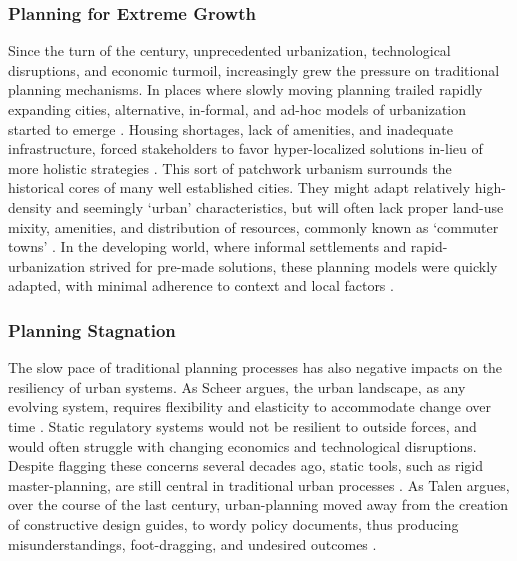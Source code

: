 {{        \subsubsection{Planning for Extreme Growth}
        {
            Since the turn of the century, unprecedented urbanization, technological disruptions, and economic turmoil, increasingly grew the pressure on traditional planning mechanisms. In places where slowly moving planning trailed rapidly expanding cities, alternative, in-formal, and ad-hoc models of urbanization started to emerge \cite{UnitedNationsHabitatIII2017}. Housing shortages, lack of amenities, and inadequate infrastructure, forced stakeholders to favor hyper-localized solutions in-lieu of more holistic strategies \cite{banerjee2011companion}. This sort of patchwork urbanism surrounds the historical cores of many well established cities. They might adapt relatively high-density and seemingly `urban' characteristics, but will often lack proper land-use mixity, amenities, and distribution of resources, commonly known as `commuter towns' \cite{united2018world, UnitedNationsHabitatIII2017}. In the developing world, where informal settlements and rapid-urbanization strived for pre-made solutions, these planning models were quickly adapted, with minimal adherence to context and local factors \cite{reckien2017climate}.
        }

        \subsubsection{Planning Stagnation}
        {
            The slow pace of traditional planning processes has also negative impacts on the resiliency of urban systems. As Scheer argues, the urban landscape, as any evolving system, requires flexibility and elasticity to accommodate change over time \cite{banerjee2011companion}. Static regulatory systems would not be resilient to outside forces, and would often struggle with changing economics and technological disruptions. Despite flagging these concerns several decades ago, static tools, such as rigid master-planning, are still central in traditional urban processes \cite{banerjee2011companion, UnitedNationsHabitatIII2017}. As Talen argues, over the course of the last century, urban-planning moved away from the creation of constructive design guides, to wordy policy documents, thus producing misunderstandings, foot-dragging, and undesired outcomes \cite{banerjee2011companion}.
        }
}}
